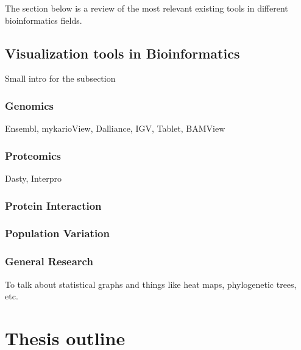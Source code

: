 The section below is a review of the most relevant existing tools in different bioinformatics fields.
\subsection{Visualization tools in Bioinformatics}
Small intro for the subsection
\subsubsection{Genomics}
Ensembl, mykarioView, Dalliance, IGV, Tablet, BAMView
\subsubsection{Proteomics}
Dasty, Interpro
\subsubsection{Protein Interaction}
\subsubsection{Population Variation}
\subsubsection{General Research}
To talk about statistical graphs and things like heat maps, phylogenetic trees, etc.


\section{Thesis outline}
